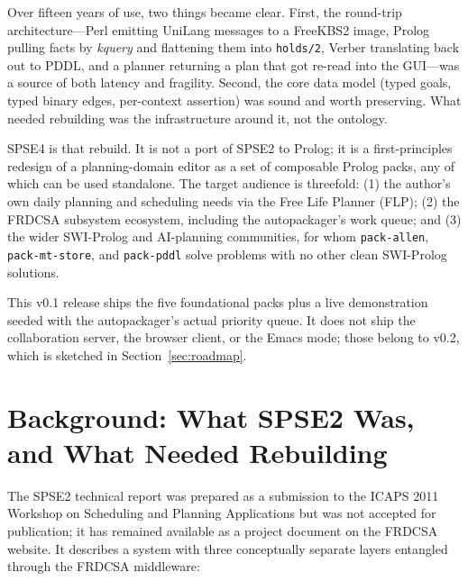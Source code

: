 \documentclass[11pt,letterpaper]{article}
\begin{document}
Over fifteen years of use, two things became clear. First, the round-trip
architecture---Perl emitting UniLang messages to a FreeKBS2 image, Prolog
pulling facts by \emph{kquery} and flattening them into \texttt{holds/2},
Verber translating back out to PDDL, and a planner returning a plan that got
re-read into the GUI---was a source of both latency and fragility. Second,
the core data model (typed goals, typed binary edges, per-context
assertion) was sound and worth preserving. What needed rebuilding was the
infrastructure around it, not the ontology.

SPSE4 is that rebuild. It is not a port of SPSE2 to Prolog; it is a
first-principles redesign of a planning-domain editor as a set of
composable Prolog packs, any of which can be used standalone. The
target audience is threefold: (1) the author's own daily planning and
scheduling needs via the Free Life Planner (FLP); (2) the FRDCSA
\citep{frdcsa-project} subsystem ecosystem, including the
autopackager's work queue; and (3) the wider SWI-Prolog and
AI-planning communities, for whom \texttt{pack-allen},
\texttt{pack-mt-store}, and \texttt{pack-pddl} solve problems with no
other clean SWI-Prolog solutions.

This v0.1 release ships the five foundational packs plus a live
demonstration seeded with the autopackager's actual priority queue. It does
not ship the collaboration server, the browser client, or the Emacs mode;
those belong to v0.2, which is sketched in Section~\ref{sec:roadmap}.

\section{Background: What SPSE2 Was, and What Needed Rebuilding}

The SPSE2 technical report was prepared as a submission to the ICAPS
2011 Workshop on Scheduling and Planning Applications but was not
accepted for publication; it has remained available as a project
document on the FRDCSA website. It describes a system with three
conceptually separate layers entangled through the FRDCSA middleware:
\end{document}
